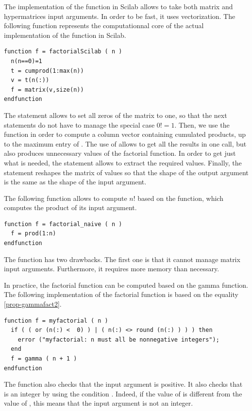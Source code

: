 The implementation of the  function in Scilab
allows to take both matrix and hypermatrices input arguments.
In order to be fast, it uses vectorization. 
The following  function represents the 
computationnal core of the actual implementation of 
the  function in Scilab.
\lstset{language=scilabscript}
\begin{lstlisting}
function f = factorialScilab ( n )
  n(n==0)=1
  t = cumprod(1:max(n))
  v = t(n(:))
  f = matrix(v,size(n))
endfunction
\end{lstlisting}
The statement  allows to set all zeros of 
the matrix  to one, so that the next statements 
do not have to manage the special case $0!=1$.
Then, we use the  function in order to compute 
a column vector containing cumulated products, up to the maximum entry of .
The use of  allows to get all the results 
in one call, but also produces unnecessary values of the factorial 
function. In order to get just what is needed, the statement 
 allows to extract the required values.
Finally, the statement  reshapes the 
matrix of values so that the shape of the output argument is the 
same as the shape of the input argument.

The following function allows to compute $n!$ based on the
 function, which computes the product of its 
input argument.
\lstset{language=scilabscript}
\begin{lstlisting}
function f = factorial_naive ( n )
  f = prod(1:n)
endfunction
\end{lstlisting}
The  function has two drawbacks. 
The first one is that it cannot manage matrix input 
arguments. Furthermore, it requires more memory than necessary.

In practice, the factorial function can be computed based on the 
gamma function. The following implementation of the factorial 
function is based on the equality \ref{prop-gammafact2}.
\lstset{language=scilabscript}
\begin{lstlisting}
function f = myfactorial ( n )
  if ( ( or (n(:) <  0) ) | ( n(:) <> round (n(:) ) ) ) then
    error ("myfactorial: n must all be nonnegative integers");
  end
  f = gamma ( n + 1 )
endfunction
\end{lstlisting}
The  function also checks that the input argument 
 is positive. It also checks that  is an integer by 
using the condition .
Indeed, if the value of  is different from the value of ,
this means that the input argument  is not an integer. 


